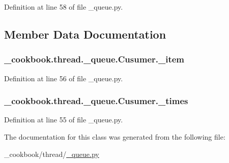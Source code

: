 Definition at line 58 of file \-\_\-queue.\-py.



\subsection{Member Data Documentation}
\hypertarget{class__cookbook_1_1thread_1_1__queue_1_1Cusumer_aab1a86eae9f000baa8ee1e0883de0611}{
\subsubsection[{\-\_\-item}]{\setlength{\rightskip}{0pt plus 5cm}\-\_\-cookbook.\-thread.\-\_\-queue.\-Cusumer.\-\_\-item\hspace{0.3cm}{\ttfamily [private]}}}\label{class__cookbook_1_1thread_1_1__queue_1_1Cusumer_aab1a86eae9f000baa8ee1e0883de0611}


Definition at line 56 of file \-\_\-queue.\-py.

\hypertarget{class__cookbook_1_1thread_1_1__queue_1_1Cusumer_a5113426d35d2d88365d4c024afdee3a4}{
\subsubsection[{\-\_\-times}]{\setlength{\rightskip}{0pt plus 5cm}\-\_\-cookbook.\-thread.\-\_\-queue.\-Cusumer.\-\_\-times\hspace{0.3cm}{\ttfamily [private]}}}\label{class__cookbook_1_1thread_1_1__queue_1_1Cusumer_a5113426d35d2d88365d4c024afdee3a4}


Definition at line 55 of file \-\_\-queue.\-py.



The documentation for this class was generated from the following file\-:\begin{DoxyCompactItemize}
\item 
\-\_\-cookbook/thread/\hyperlink{__queue_8py}{\-\_\-queue.\-py}\end{DoxyCompactItemize}
